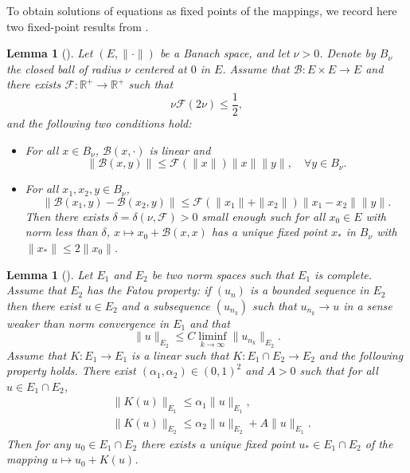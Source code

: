 \documentclass[12pt]{amsart}
\newtheorem{lemma}[theorem]{Lemma}
\theoremstyle{definition}
\numberwithin{equation}{section}
\newcommand{\R}{\mathbb{R}}
\newcommand{\f}{\frac}
\begin{document}
To obtain solutions of equations as fixed points of the mappings, we record here two fixed-point results from \cite{MR4348695}.
\begin{lemma}[\hspace{1sp}\cite{MR4348695}] \label{t:fixedpoint}
Let $(E, \|\cdot\|)$ be a Banach space, and let $\nu >0$.
Denote by $B_\nu$ the closed ball of radius $\nu$ centered at $0$ in $E$. 
Assume that $\mathcal{B}:E\times E \rightarrow E$ and there exists $\mathcal{F}: \R^+ \rightarrow \R^+$ such that
\begin{equation*} %
\nu \mathcal{F}(2\nu) \leq \f12,
\end{equation*}
and the following two conditions hold:
\begin{itemize}
\item For all $x\in B_\nu$, $\mathcal{B}(x, \cdot)$ is linear and
\begin{equation*} %
 \|\mathcal{B}(x, y)\| \leq \mathcal{F}(\|x\|)\|x\| \|y\|, \quad \forall y\in B_\nu.
\end{equation*}
\item For all $x_1, x_2, y \in B_\nu$,
\begin{equation*} %
 \|\mathcal{B}(x_1, y) - \mathcal{B}(x_2, y) \| \leq \mathcal{F}(\|x_1\| + \|x_2\|)\|x_1 - x_2\| \|y\|.
\end{equation*}
Then there exists $\delta = \delta(\nu, \mathcal{F})>0$ small enough such for all $x_0 \in E$ with norm less than $\delta$, $x \mapsto x_0 + \mathcal{B}(x,x)$ has a unique fixed point $x_*$ in $B_\nu$ with $\|x_*\| \leq 2\|x_0\|$.
\end{itemize}
\end{lemma}

\begin{lemma}[\hspace{1sp}\cite{MR4348695}]\label{t:fp}
Let $E_1$ and $E_2$ be two norm spaces such that $E_1$ is complete. Assume that $E_2$ has the Fatou property: if $(u_n)$ is a bounded sequence in $E_2$ then there exist $u\in E_2$ and a subsequence $(u_{n_k})$ such that $u_{n_k}\to u$ in a sense weaker than norm convergence in $E_1$ and that 
\[
\| u\|_{E_2}\le C\liminf_{k\to \infty} \| u_{n_k}\|_{ E_2}.
\]
 Assume that $K:E_1\to E_1$ is a linear such that $K: E_1\cap E_2\to E_2$ and the following property holds.  There exist $(\alpha_1, \alpha_2)\in (0, 1)^2$ and $A>0$ such that for all $u\in E_1\cap E_2$, 
\begin{align*}
&\| K(u)\|_{E_1}\le \alpha_1 \| u\|_{E_1}, \\
&\|K(u)\|_{E_2}\le \alpha_2\| u\|_{E_2}+A \| u\|_{E_1}. 
\end{align*}
Then for any $u_0\in E_1\cap E_2$ there exists a unique fixed point $u_*\in E_1\cap E_2$ of the mapping $u\mapsto u_0+K(u)$.
\end{lemma}
\end{document}
